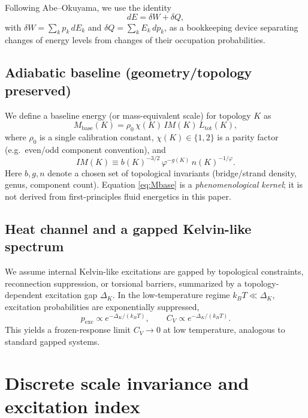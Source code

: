 \documentclass[11pt, a4paper]{article}
\newcommand{\Ltot}{L_{\text{tot}}}
\newcommand{\goldenratio}{\varphi}
\begin{document}
Following Abe--Okuyama, we use the identity
\begin{equation}
dE = \delta W + \delta Q,
\label{eq:firstlaw}
\end{equation}
with \(\delta W=\sum_k p_k\,dE_k\) and \(\delta Q=\sum_k E_k\,dp_k\), as a bookkeeping device separating changes of energy levels from changes of their occupation probabilities.

\subsection{Adiabatic baseline (geometry/topology preserved)}
We define a baseline energy (or mass-equivalent scale) for topology \(K\) as
\begin{equation}
M_{\mathrm{base}}(K) = \rho_0\,\chi(K)\,IM(K)\,\Ltot(K),
\label{eq:Mbase}
\end{equation}
where \(\rho_0\) is a single calibration constant, \(\chi(K)\in\{1,2\}\) is a parity factor (e.g.\ even/odd component convention), and
\begin{equation}
IM(K) \equiv b(K)^{-3/2}\,\goldenratio^{-g(K)}\,n(K)^{-1/\goldenratio}.
\label{eq:IM}
\end{equation}
Here \(b,g,n\) denote a chosen set of topological invariants (bridge/strand density, genus, component count). Equation \eqref{eq:Mbase} is a \emph{phenomenological kernel}; it is not derived from first-principles fluid energetics in this paper.

\subsection{Heat channel and a gapped Kelvin-like spectrum}
We assume internal Kelvin-like excitations are gapped by topological constraints, reconnection suppression, or torsional barriers, summarized by a topology-dependent excitation gap \(\Delta_K\).
In the low-temperature regime \(k_BT\ll \Delta_K\), excitation probabilities are exponentially suppressed,
\begin{equation}
p_{\mathrm{exc}} \propto e^{-\Delta_K/(k_BT)},
\qquad
C_V \propto e^{-\Delta_K/(k_BT)}.
\label{eq:gap_supp}
\end{equation}
This yields a frozen-response limit \(C_V\to 0\) at low temperature, analogous to standard gapped systems.

\section{Discrete scale invariance and excitation index}
\label{sec:dsi}
\end{document}
